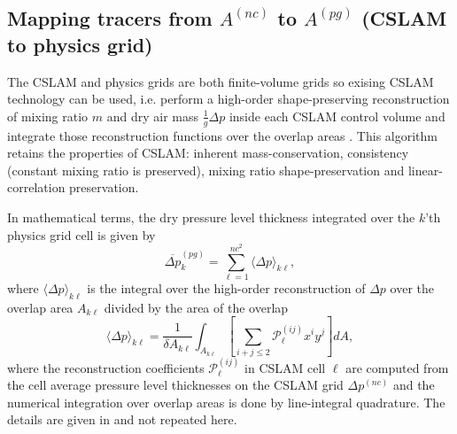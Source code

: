 \subsection{Mapping tracers from $A^{(nc)}$ to $A^{(pg)}$ (CSLAM to physics grid)}\label{sec:nctopg}
The CSLAM and physics grids are both finite-volume grids so exising CSLAM technology can be used, i.e. perform a high-order shape-preserving reconstruction of mixing ratio $m$ and dry air mass  $\frac{1}{g}\Delta p$ inside each CSLAM control volume and integrate those reconstruction functions over the overlap areas \citep{LNU2010JCP,NL2010JCP}. This algorithm retains the properties of CSLAM: inherent mass-conservation, consistency (constant mixing ratio is preserved), mixing ratio shape-preservation and linear-correlation preservation. 

In mathematical terms, the dry pressure level thickness integrated over the $k$'th physics grid cell is given by
\begin{equation}
\overline{\Delta p}^{(pg)}_k=\sum_{\ell=1}^{nc^2}\langle \Delta p\rangle_{k\ell},
\end{equation}
where $\langle \Delta p\rangle_{k\ell}$ is the integral over the high-order reconstruction of $\Delta p$ over the overlap area $A_{k\ell}$ divided by the area of the overlap
\begin{equation}
\langle \Delta p\rangle_{k\ell}=\frac{1}{\delta A_{k\ell}}\int_{A_{k\ell}}\left[ \sum_{i+j\le 2}{\mathcal{P}}^{(ij)}_\ell x^{i}y^{j}\right] dA,
\end{equation}
where the reconstruction coefficients ${\mathcal{P}}^{(ij)}_\ell$ in CSLAM cell $\ell$ are computed from the cell average pressure level thicknesses on the CSLAM grid $\Delta p^{(nc)}$ and the numerical integration over overlap areas is done by line-integral quadrature. The details are given in \cite{LNU2010JCP} and not repeated here.

